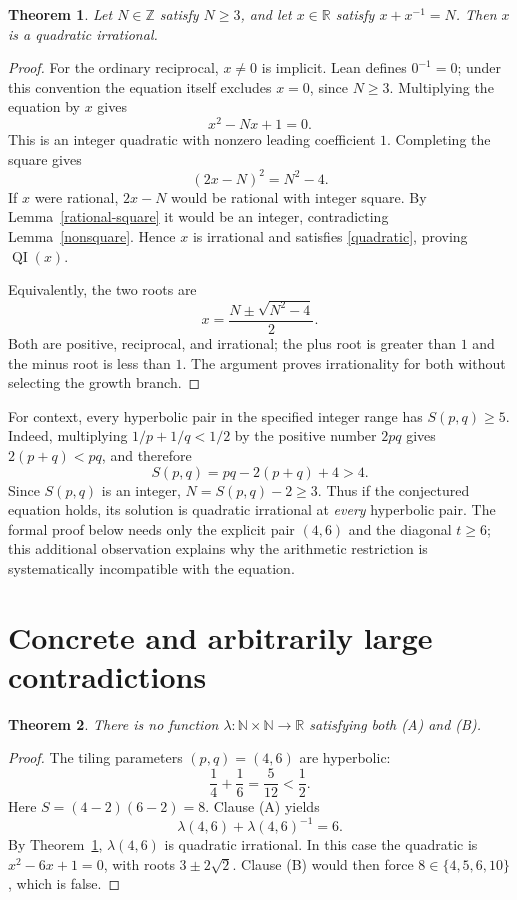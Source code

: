 \documentclass[11pt]{article}
\newtheorem{theorem}{Theorem}
\newcommand{\QI}{\operatorname{QI}}
\begin{document}
\begin{theorem}\label{general}
Let $N\in\mathbb Z$ satisfy $N\ge3$, and let $x\in\mathbb R$ satisfy
$x+x^{-1}=N$. Then $x$ is a quadratic irrational.
\end{theorem}
\begin{proof}
For the ordinary reciprocal, $x\ne0$ is implicit. Lean defines $0^{-1}=0$;
under this convention the equation itself excludes $x=0$, since $N\ge3$.
Multiplying the equation by $x$ gives
\begin{equation}\label{quadratic}
x^2-Nx+1=0.
\end{equation}
This is an integer quadratic with nonzero leading coefficient $1$.
Completing the square gives
\[
(2x-N)^2=N^2-4.
\]
If $x$ were rational, $2x-N$ would be rational with integer square.
By Lemma~\ref{rational-square} it would be an integer, contradicting
Lemma~\ref{nonsquare}. Hence $x$ is irrational and satisfies
\eqref{quadratic}, proving $\QI(x)$.

Equivalently, the two roots are
\[
x=\frac{N\pm\sqrt{N^2-4}}{2}.
\]
Both are positive, reciprocal, and irrational; the plus root is greater
than $1$ and the minus root is less than $1$. The argument proves
irrationality for both without selecting the growth branch.
\end{proof}

For context, every hyperbolic pair in the specified integer range has
$S(p,q)\ge5$. Indeed, multiplying $1/p+1/q<1/2$ by the positive number $2pq$
gives $2(p+q)<pq$, and therefore
\[
S(p,q)=pq-2(p+q)+4>4.
\]
Since $S(p,q)$ is an integer, $N=S(p,q)-2\ge3$. Thus if the conjectured
equation holds, its solution is quadratic irrational at \emph{every}
hyperbolic pair. The formal proof below needs only the explicit pair
$(4,6)$ and the diagonal $t\ge6$; this additional observation explains why
the arithmetic restriction is systematically incompatible with the equation.

\section{Concrete and arbitrarily large contradictions}
\begin{theorem}\label{concrete}
There is no function $\lambda:\mathbb N\times\mathbb N\to\mathbb R$
satisfying both (A) and (B).
\end{theorem}
\begin{proof}
The tiling parameters $(p,q)=(4,6)$ are hyperbolic:
\[
\frac14+\frac16=\frac5{12}<\frac12.
\]
Here $S=(4-2)(6-2)=8$. Clause (A) yields
\[
\lambda(4,6)+\lambda(4,6)^{-1}=6.
\]
By Theorem~\ref{general}, $\lambda(4,6)$ is quadratic irrational.
In this case the quadratic is $x^2-6x+1=0$, with roots
$3\pm2\sqrt2$. Clause (B) would then force
$8\in\{4,5,6,10\}$, which is false.
\end{proof}
\end{document}
